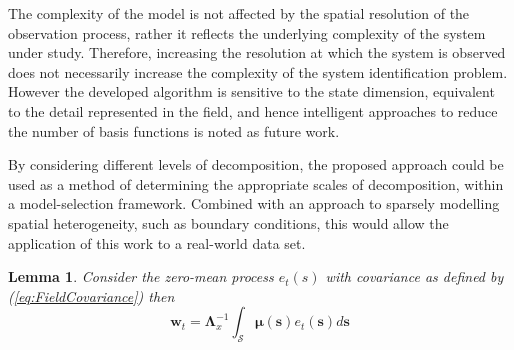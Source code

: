 \documentclass[journal,a4paper]{IEEEtran}
\begin{document}
{{The complexity of the model is not affected by the spatial resolution of the observation process, rather it reflects the underlying complexity of the system under study. Therefore, increasing the resolution at which the system is observed does not necessarily increase the complexity of the system identification problem. However the developed algorithm is sensitive to the state dimension, equivalent to the detail represented in the field, and hence intelligent approaches to reduce the number of basis functions is noted as future work. 

By considering different levels of decomposition, the proposed approach could be used as a method of determining the appropriate scales of decomposition, within a model-selection framework. Combined with an approach to sparsely modelling spatial heterogeneity, such as boundary conditions, this would allow the application of this work to a real-world data set.
\appendix  %
%
\newtheorem{lemma}{Lemma}
\begin{lemma}
Consider the zero-mean process $e_t\left(s\right)$ with covariance as defined by (\ref{eq:FieldCovariance}) then
\begin{equation}
 \mathbf{w}_t=\mathbf{\Lambda}_{x}^{-1}\int_{\mathcal{S}}\boldsymbol\mu \left(\mathbf{s}\right)e_t\left(\mathbf{s}\right)d\mathbf{s}
\label{eq:AppendixWt}
\end{equation}

\end{lemma}}}
\end{document}

